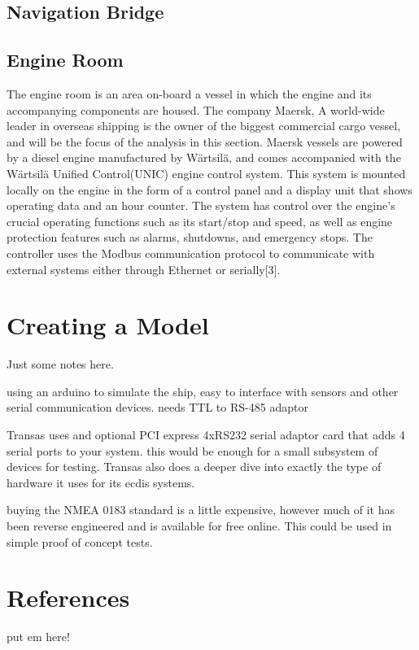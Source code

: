 \documentclass{report}
\begin{document}
\section{Navigation Bridge}
 






\section{Engine Room}
The engine room is an area on-board a vessel in which the engine and its accompanying components are housed. The company Maersk, A world-wide leader in overseas shipping is the owner of the biggest commercial cargo vessel, and will be the focus of the analysis in this section. Maersk vessels are powered by a diesel engine manufactured by Wärtsilä, and comes accompanied with the Wärtsilä Unified Control(UNIC) engine control system. This system is mounted locally on the engine in the form of a control panel and a display unit that shows operating data and an hour counter. The system has control over the engine's crucial operating functions such as its start/stop and  speed, as well as engine protection features such as alarms, shutdowns, and emergency stops. The controller uses the Modbus communication protocol to communicate with external systems either through Ethernet or serially[3]. 

\chapter{Creating a Model}

Just some notes here.

using an arduino to simulate the ship, easy to interface with sensors and other serial communication devices. needs TTL to RS-485 adaptor 

Transas uses and optional PCI express 4xRS232 serial adaptor card that adds 4 serial ports to your system. this would be enough for a small subsystem of devices for testing. Transas also does a deeper dive into exactly the type of hardware it uses for its ecdis systems.

buying the NMEA 0183 standard is a little expensive, however much of it has been reverse engineered and is available for free online. This could be used in simple proof of concept tests.

\chapter{References}
put em here!
\end{document}
